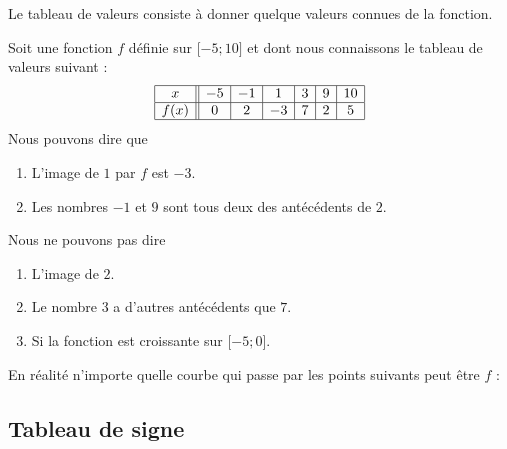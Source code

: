 Le tableau de valeurs consiste à donner quelque valeurs connues de la fonction.

\begin{example}
    Soit une fonction \( f\) définie sur \( \mathopen[ -5 ; 10 \mathclose]\) et dont nous connaissons le tableau de valeurs suivant :
    \begin{equation}
        \begin{array}[h]{|c||c|c|c|c|c|c|}
            \hline
            x&-5&-1&1&3&9&10\\
            \hline
            f(x)&0&2&-3&7&2&5\\
            \hline
        \end{array}
    \end{equation}
    Nous pouvons dire que
    \begin{enumerate}
        \item
            L'image de \( 1\) par \( f\) est \( -3\).
        \item
            Les nombres \( -1\) et \( 9\) sont tous deux des antécédents de \( 2\).
    \end{enumerate}
    Nous ne pouvons pas dire 
    \begin{enumerate}
        \item
            L'image de \( 2\).
        \item
            Le nombre \( 3\) a d'autres antécédents que \( 7\).
        \item
            Si la fonction est croissante sur \( \mathopen[ -5 ;0 \mathclose]\).
    \end{enumerate}


    En réalité n'importe quelle courbe qui passe par les points suivants peut être \( f\) :
    \begin{center}
   
    \end{center}

\end{example}

\subsection{Tableau de signe}

